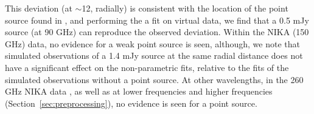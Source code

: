 \documentclass[twocolumn,traditabstract]{aa}
\begin{document}
This deviation (at $\sim$12\asec, radially) is consistent with the location of the point source found in
\citet{korngut2011}, and performing the a fit on virtual data, we find that a 0.5 mJy source (at 90 GHz)
can reproduce the observed deviation. Within the NIKA (150 GHz) data, no evidence for a weak point source is seen,
although, we note that simulated observations of a 1.4 mJy source at the same radial distance does not have a
significant effect on the non-parametric fits, relative to the fits of the simulated observations without a point source.
At other wavelengths, in the 260 GHz NIKA data \citep{adam2015}, as well as at lower frequencies and higher frequencies
(Section~\ref{sec:preprocessing}), no evidence is seen for a point source.




\end{document}
